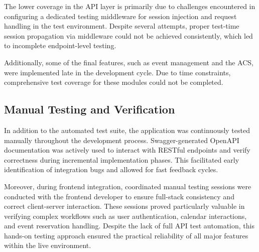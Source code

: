 The lower coverage in the API layer is primarily due to challenges encountered in configuring a dedicated testing middleware for session injection and request handling in the test environment. Despite several attempts, proper test-time session propagation via middleware could not be achieved consistently, which led to incomplete endpoint-level testing.

Additionally, some of the final features, such as event management and the ACS, were implemented late in the development cycle. Due to time constraints, comprehensive test coverage for these modules could not be completed.

\subsection{Manual Testing and Verification}

In addition to the automated test suite, the application was continuously tested manually throughout the development process. Swagger-generated OpenAPI documentation was actively used to interact with RESTful endpoints and verify correctness during incremental implementation phases. This facilitated early identification of integration bugs and allowed for fast feedback cycles.

Moreover, during frontend integration, coordinated manual testing sessions were conducted with the frontend developer to ensure full-stack consistency and correct client-server interaction. These sessions proved particularly valuable in verifying complex workflows such as user authentication, calendar interactions, and event reservation handling. Despite the lack of full API test automation, this hands-on testing approach ensured the practical reliability of all major features within the live environment.


